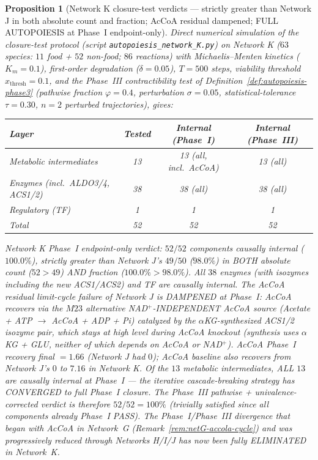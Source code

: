 \documentclass[11pt,a4paper]{article}
\theoremstyle{plain}
\newtheorem{proposition}[theorem]{Proposition}
\theoremstyle{definition}
\theoremstyle{remark}
\begin{document}
\begin{proposition}[Network K closure-test verdicts --- strictly
greater than Network J in both absolute count and fraction; AcCoA
residual dampened; FULL AUTOPOIESIS at Phase~I endpoint-only]
\label{prop:netK-verdict}
Direct numerical simulation of the closure-test protocol
(script \texttt{autopoiesis\_network\_K.py}) on Network K
($63$ species: $11$ food + $52$ non-food; $86$ reactions) with
Michaelis--Menten kinetics ($K_m = 0.1$), first-order degradation
($\delta = 0.05$), $T = 500$ steps, viability threshold
$x_{\mathrm{thresh}} = 0.1$, and the Phase~III contractibility test
of Definition~\ref{def:autopoiesis-phase3} (pathwise fraction
$\varphi = 0.4$, perturbation $\sigma = 0.05$, statistical-tolerance
$\tau = 0.30$, $n = 2$ perturbed trajectories), gives:
\begin{center}\footnotesize
\begin{tabular}{lccc}
\toprule
Layer & Tested & Internal (Phase~I) & Internal (Phase~III) \\
\midrule
Metabolic intermediates & 13 & 13 (all, incl.~AcCoA) & 13 (all) \\
Enzymes (incl.~ALDO3/4, ACS1/2) & 38 & 38 (all) & 38 (all) \\
Regulatory (TF) & 1 & 1 & 1 \\
\midrule
Total & 52 & 52 & 52 \\
\bottomrule
\end{tabular}
\end{center}
Network K Phase~I endpoint-only verdict: $52/52$ components causally
internal ($100.0\%$), strictly greater than Network J's $49/50$
($98.0\%$) in BOTH absolute count ($52 > 49$) AND fraction
($100.0\% > 98.0\%$). All $38$ enzymes (with isozymes including the
new ACS1/ACS2) and TF are causally internal. The AcCoA residual
limit-cycle failure of Network J is DAMPENED at Phase~I: AcCoA
recovers via the $M23$ alternative NAD$^+$-INDEPENDENT AcCoA source
(Acetate + ATP $\to$ AcCoA + ADP + Pi) catalyzed by the
$\alpha$KG-synthesized ACS1/2 isozyme pair, which stays at high
level during AcCoA knockout (synthesis uses $\alpha$KG + GLU,
neither of which depends on AcCoA or NAD$^+$). AcCoA Phase~I
recovery final $= 1.66$ (Network J had $0$); AcCoA baseline also
recovers from Network J's $0$ to $7.16$ in Network K. Of the $13$
metabolic intermediates, ALL $13$ are causally internal at
Phase~I --- the iterative cascade-breaking strategy has CONVERGED to
full Phase~I closure. The Phase~III pathwise + univalence-corrected
verdict is therefore $52/52 = 100\%$ (trivially satisfied since all
components already Phase~I PASS). The Phase~I/Phase~III divergence
that began with AcCoA in Network~G (Remark~\ref{rem:netG-accola-cycle})
and was progressively reduced through Networks H/I/J has now been
fully ELIMINATED in Network~K.
\end{proposition}
\end{document}
